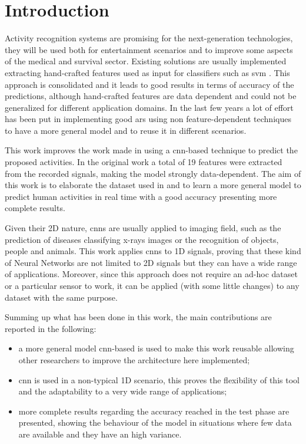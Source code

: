
\section{Introduction}
\label{sec:introduction}

Activity recognition systems are promising for the next-generation technologies, they will be used both for entertainment scenarios and to improve some aspects of the medical and survival sector.
Existing solutions are usually implemented extracting hand-crafted features used as input for classifiers such as \gls{svm} \cite{Elvira14, Hamalainen11, Khan10}.
This approach is consolidated and it leads to good results in terms of accuracy of the predictions, although hand-crafted features are data dependent and could not be generalized for different application domains.
In the last few years a lot of effort has been put in implementing good \gls{ars} using non feature-dependent techniques to have a more general model and to reuse it in different scenarios.

This work improves the work made in \cite{Frank10} using a \gls{cnn}-based technique to predict the proposed activities.
In the original work a total of 19 features were extracted from the recorded signals, making the model strongly data-dependent.
The aim of this work is to elaborate the dataset used in \cite{Frank10} and to learn a more general model to predict human activities in real time with a good accuracy presenting more complete results.

Given their 2D nature, \glspl{cnn} are usually applied to imaging field, such as the prediction of diseases classifying x-rays images or the recognition of objects, people and animals.
This work applies \glspl{cnn} to 1D signals, proving that these kind of Neural Networks are not limited to 2D signals but they can have a wide range of applications.
Moreover, since this approach does not require an ad-hoc dataset or a particular sensor to work, it can be applied (with some little changes) to any dataset with the same purpose.

Summing up what has been done in this work, the main contributions are reported in the following:
\begin{itemize}
\item a more general model \gls{cnn}-based is used to make this work reusable allowing other researchers to improve the architecture here implemented;
\item \gls{cnn} is used in a non-typical 1D scenario, this proves the flexibility of this tool and the adaptability to a very wide range of applications;
\item more complete results regarding the accuracy reached in the test phase are presented, showing the behaviour of the model in situations where few data are available and they have an high variance.
\end{itemize}

